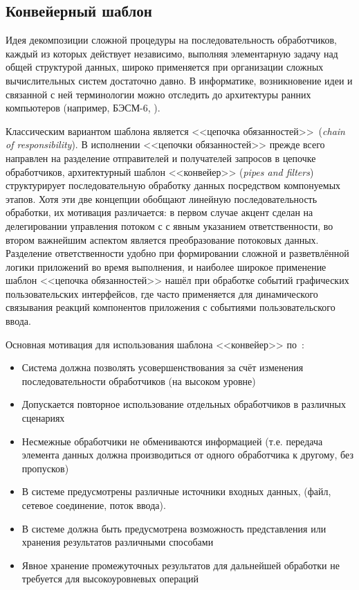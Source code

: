 \subsection{Конвейерный шаблон}

Идея декомпозиции сложной процедуры на последовательность
обработчиков, каждый из которых действует независимо, выполняя
элементарную задачу над общей структурой данных, широко применяется
при организации сложных вычислительных систем достаточно давно.
В информатике, возникновение идеи и
связанной с ней терминологии можно отследить до архитектуры ранних
компьютеров (например, БЭСМ-6, \cite{smirnov-besm6}).

Классическим вариантом шаблона является
<<цепочка обязанностей>>~(\emph{chain of responsibility}).
В исполнении <<цепочки обязанностей>> прежде всего направлен на
разделение отправителей и получателей запросов в цепочке обработчиков,
архитектурный шаблон <<конвейер>> (\emph{pipes and filters})~\cite{Buschmann-patterns-vol1}
структурирует последовательную обработку данных посредством компонуемых
этапов. Хотя эти две концепции обобщают линейную последовательность
обработки, их мотивация различается:
в первом случае акцент сделан на делегировании управления потоком с
с явным указанием ответственности,
во втором важнейшим аспектом является преобразование потоковых данных.
Разделение ответственности удобно при формировании сложной и разветвлённой
логики приложений во время выполнения, и наиболее широкое применение шаблон
<<цепочка обязанностей>> нашёл при обработке событий графических
пользовательских интерфейсов, где часто применяется для динамического
связывания реакций компонентов приложения с событиями пользовательского
ввода.

Основная мотивация для использования шаблона <<конвейер>> по~\cite{Buschmann-patterns-vol1}:

\begin{itemize}
    \item Система должна позволять усовершенствования за счёт
    изменения последовательности обработчиков (на высоком уровне)
    \item Допускается повторное использование отдельных обработчиков
    в различных сценариях
    \item Несмежные обработчики не обмениваются информацией (т.е.
    передача элемента данных должна производиться от одного обработчика
    к другому, без пропусков)
    \item В системе предусмотрены различные источники входных данных,
    (файл, сетевое соединение, поток ввода).
    \item В системе должна быть предусмотрена возможность представления
    или хранения результатов различными способами
    \item Явное хранение промежуточных результатов для дальнейшей
    обработки не требуется для высокоуровневых операций
\end{itemize}

